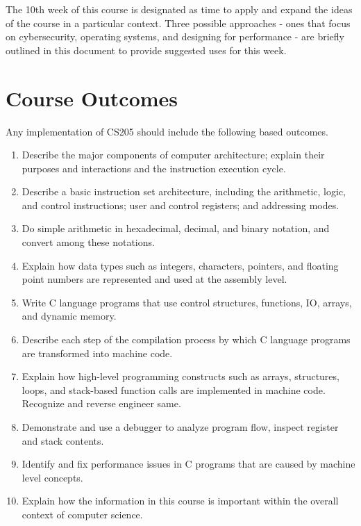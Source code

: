 \documentclass[12pt,letterpaper]{article}
\begin{document}
	The 10th week of this course is designated as time to apply and expand the ideas of the course in a particular context. Three possible approaches - ones that focus on cybersecurity, operating systems, and designing for performance - are briefly outlined in this document to provide suggested uses for this week.
	\clearpage

	
	\section{Course Outcomes}

	Any implementation of CS205 should include the following based outcomes.

	\begin{enumerate}
		\item Describe the major components of computer architecture; explain their purposes and interactions and the instruction execution cycle.
		\item Describe a basic instruction set architecture, including the arithmetic, logic, and control instructions; user and control registers; and addressing modes.
		\item Do simple arithmetic in hexadecimal, decimal, and binary notation, and convert among these notations.
		\item Explain how data types such as integers, characters, pointers, and floating point numbers are represented and used at the assembly level.
		\item Write C language programs that use control structures, functions, IO, arrays, and dynamic memory.
		\item Describe each step of the compilation process by which C language programs are transformed into machine code.  
		\item Explain how high-level programming constructs such as arrays, structures, loops, and stack-based function calls are implemented in  machine code. Recognize and reverse engineer same.
		\item Demonstrate and use a debugger to analyze program flow, inspect register and stack contents. 
		\item Identify and fix performance issues in C programs that are caused by machine level concepts.
		\item Explain how the information in this course is important within the overall context of computer science.
	\end{enumerate}

	\clearpage
	
\end{document}
